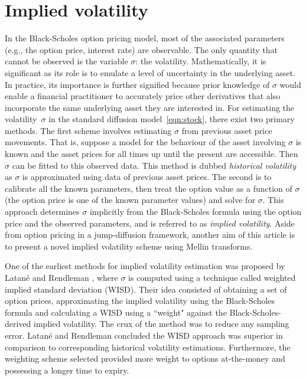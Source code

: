 \section{Implied volatility}
		In the Black-Scholes option pricing model, most of the associated parameters (e.g., the option price, interest rate) are observable. The only quantity that cannot be observed is the variable $\sigma$: the volatility. Mathematically, it is significant as its role is to emulate a level of uncertainty in the underlying asset. In practice, its importance is further signified because prior knowledge of $\sigma$ would enable a financial practitioner to accurately price other derivatives that also incorporate the same underlying asset they are interested in. 
		For estimating the volatility~$\sigma$ in the standard diffusion model~\eqref{eqn:stock}, there exist two primary methods. The first scheme involves estimating $\sigma$ from previous asset price movements. That is, suppose a model for the behaviour of the asset involving $\sigma$ is known and the asset prices for all times up until the present are accessible. Then $\sigma$ can be fitted to this observed data. This method is dubbed \emph{historical volatility} as $\sigma$ is approximated using data of previous asset prices. The second is to calibrate all the known parameters, then treat the option value as a function of $\sigma$ (the option price is one of the known parameter values) and solve for $\sigma$. This approach determines $\sigma$ implicitly from the Black-Scholes formula using the option price and the observed parameters, and is referred to as \emph{implied volatility}.  Aside from option pricing in a jump-diffusion framework, another aim of this article is to present a novel implied volatility scheme using Mellin transforms.

One of the earliest methods for implied volatility estimation was proposed by Latan\'e and Rendleman \cite{Latane76}, where $\sigma$ is computed using a technique called weighted implied standard deviation (WISD). Their idea consisted of obtaining a set of option prices, approximating the implied volatility using the Black-Scholes formula and calculating a WISD using a ``weight" against the Black-Scholes-derived implied volatility. The crux of the method was to reduce any sampling error. Latan\'e and Rendleman concluded the WISD approach was superior in comparison to corresponding historical volatility estimations. Furthermore, the weighting scheme selected provided more weight to options at-the-money and possessing a longer time to expiry.

